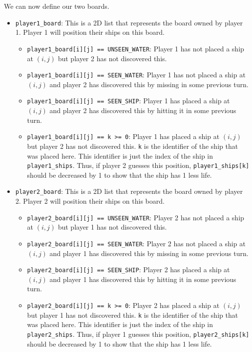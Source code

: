 \documentclass{article}
\begin{document}
We can now define our two boards.
\begin{itemize}
    \item \texttt{player1\_board}: This is a 2D list that represents the board owned by player 1. Player 1 will position their ships on this board.
    \begin{itemize}
        \item \texttt{player1\_board[i][j] == UNSEEN\_WATER}: Player 1 has not placed a ship at $(i,j)$ but player 2 has not discovered this.
        \item \texttt{player1\_board[i][j] == SEEN\_WATER}: Player 1 has not placed a ship at $(i,j)$ and player 2 has discovered this by missing in some previous turn.
        \item \texttt{player1\_board[i][j] == SEEN\_SHIP}: Player 1 has placed a ship at $(i,j)$ and player 2 has discovered this by hitting it in some previous turn.
        \item \texttt{player1\_board[i][j] == k >= 0}: Player 1 has placed a ship at $(i,j)$ but player 2 has not discovered this. \texttt{k} is the identifier of the ship that was placed here. This identifier is just the index of the ship in \texttt{player1\_ships}. Thus, if player 2 guesses this position, \texttt{player1\_ships[k]} should be decreased by 1 to show that the ship has 1 less life.
    \end{itemize}
    \item \texttt{player2\_board}: This is a 2D list that represents the board owned by player 2. Player 2 will position their ships on this board.
    \begin{itemize}
        \item \texttt{player2\_board[i][j] == UNSEEN\_WATER}: Player 2 has not placed a ship at $(i,j)$ but player 1 has not discovered this.
        \item \texttt{player2\_board[i][j] == SEEN\_WATER}: Player 2 has not placed a ship at $(i,j)$ and player 1 has discovered this by missing in some previous turn.
        \item \texttt{player2\_board[i][j] == SEEN\_SHIP}: Player 2 has placed a ship at $(i,j)$ and player 1 has discovered this by hitting it in some previous turn.
        \item \texttt{player2\_board[i][j] == k >= 0}: Player 2 has placed a ship at $(i,j)$ but player 1 has not discovered this. \texttt{k} is the identifier of the ship that was placed here. This identifier is just the index of the ship in \texttt{player2\_ships}. Thus, if player 1 guesses this position, \texttt{player2\_ships[k]} should be decreased by 1 to show that the ship has 1 less life.
    \end{itemize}
\end{itemize}
\end{document}

